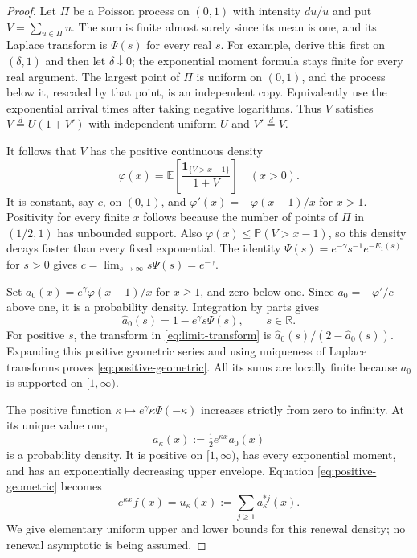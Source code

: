 \documentclass[11pt,letterpaper]{article}
\newcommand{\PP}{\mathbb P}\newcommand{\EE}{\mathbb E}
\newcommand{\ind}{\mathbf 1}\newcommand{\Exp}{\operatorname{Exp}}
\begin{document}
\begin{proof}
Let $\Pi$ be a Poisson process on $(0,1)$ with intensity $du/u$ and
put $V=\sum_{u\in\Pi}u$. The sum is finite almost surely since its mean
is one, and its Laplace transform is $\Psi(s)$ for every real $s$.
For example, derive this first on $(\delta,1)$ and then let
$\delta\downarrow0$; the exponential moment formula stays finite for
every real argument. The largest point of $\Pi$ is uniform on $(0,1)$,
and the process below it, rescaled by that point, is an independent copy.
Equivalently use the exponential arrival times after taking negative
logarithms. Thus $V$ satisfies $V\overset d=U(1+V')$ with independent
uniform $U$ and $V'\overset d=V$.

It follows that $V$ has the positive continuous density
\[
 \varphi(x)=\EE\left[\frac{\ind_{\{V>x-1\}}}{1+V}\right]\quad(x>0).
\]
It is constant, say $c$, on $(0,1)$, and
$\varphi'(x)=-\varphi(x-1)/x$ for $x>1$. Positivity for every finite $x$
follows because the number of points of $\Pi$ in $(1/2,1)$ has unbounded
support. Also $\varphi(x)\le\PP(V>x-1)$, so this density decays faster
than every fixed exponential. The identity
$\Psi(s)=e^{-\gamma}s^{-1}e^{-E_1(s)}$ for $s>0$ gives
$c=\lim_{s\to\infty}s\Psi(s)=e^{-\gamma}$.

Set $a_0(x)=e^\gamma\varphi(x-1)/x$ for $x\ge1$, and zero below one.
Since $a_0=-\varphi'/c$ above one, it is a probability density.
Integration by parts gives
\[
 \widehat a_0(s)=1-e^\gamma s\Psi(s),\qquad s\in\mathbb R.
\]
For positive $s$, the transform in \eqref{eq:limit-transform} is
$\widehat a_0(s)/(2-\widehat a_0(s))$. Expanding this positive geometric
series and using uniqueness of Laplace transforms proves
\eqref{eq:positive-geometric}. All its sums are locally finite because
$a_0$ is supported on $[1,\infty)$.

The positive function $\kappa\mapsto e^\gamma\kappa\Psi(-\kappa)$
increases strictly from zero to infinity. At its unique value one,
\[
 a_\kappa(x):=\tfrac12 e^{\kappa x}a_0(x)
\]
is a probability density. It is positive on $[1,\infty)$, has every
exponential moment, and has an exponentially decreasing upper envelope.
Equation \eqref{eq:positive-geometric} becomes
\begin{equation}\label{eq:tilted-renewal}
 e^{\kappa x}f(x)=u_\kappa(x)
       :=\sum_{j\ge1}a_\kappa^{*j}(x).
\end{equation}
We give elementary uniform upper and lower bounds for this renewal
density; no renewal asymptotic is being assumed.


\end{proof}
\end{document}
